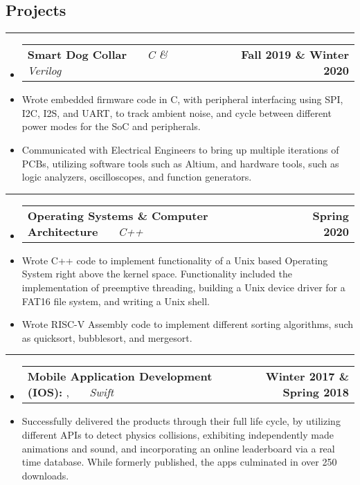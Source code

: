 \documentclass[10pt,letterpaper]{article}
\makeatletter
\newcommand{\header}[2]
{
	\begin{tabular*}{\linewidth}{l @{\extracolsep{\fill}} r}
		\hspace{-27pt} #1 & #2 \\
	\end{tabular*}
}
\newcommand{\sectionbreak}
{
	\vspace{-1.2em}
	\rule{\textwidth}{1.7pt}
	\vspace{-1.7em}
}
\makeatother
\begin{document}
\vspace{-1.5em}

\subsection*{Projects}
\sectionbreak


\begin{itemize}
	\item[]
		\header
		{
			\textbf{Smart Dog Collar}
			\emph{\smash{Senior Design Project}} \ \ \ \footnotesize \emph{C \& Verilog}
		}
		{\textbf{Fall 2019 \& Winter 2020}}
	\item 
		Wrote embedded firmware code in C, with peripheral interfacing using SPI, I2C, I2S, and UART, to track ambient noise, and cycle between different power modes for the SoC and peripherals.
	\item 
		Communicated with Electrical Engineers to bring up multiple iterations of PCBs, utilizing software tools such as Altium, and hardware tools, such as logic analyzers, oscilloscopes, and function generators.

\end{itemize}

\hrule

\begin{itemize}
	\item[]
		\header
		{
			\textbf{Operating Systems \& Computer Architecture}
			\emph{\smash{Relevant Course Projects}} \ \ \ \footnotesize \emph{C++}
		}
		{\textbf{Spring 2020}}
	\item 
		Wrote C++ code to implement functionality of a Unix based Operating System right above the kernel space. Functionality included the implementation of preemptive threading, building a Unix device driver for a FAT16 file system, and writing a Unix shell.
	\item 
		Wrote RISC-V Assembly code to implement different sorting algorithms, such as quicksort, bubblesort, and mergesort. 

\end{itemize}
\hrule
\begin{itemize}
	\item[]
		\header
		{
			\textbf{Mobile Application Development (IOS): }
			\href{https://appadvice.com/app/round-bound/1369632746}{\emph{\underline{\smash{Round 'a Bound}}}}, 
			\href{https://appadvice.com/app/tic-tac-emoji/1346934986}{\emph{\underline{\smash{Tic-Tac Emoji}}}} \ \ \ \footnotesize  \emph{Swift}
		}
		{\textbf{Winter 2017 \& Spring 2018}}
	\item 
		Successfully delivered the products through their full life cycle, by utilizing different APIs to detect physics collisions, exhibiting independently made animations and sound, and incorporating an online leaderboard via a real time database. While formerly published, the apps culminated in over 250 downloads.
\end{itemize}
\end{document}
